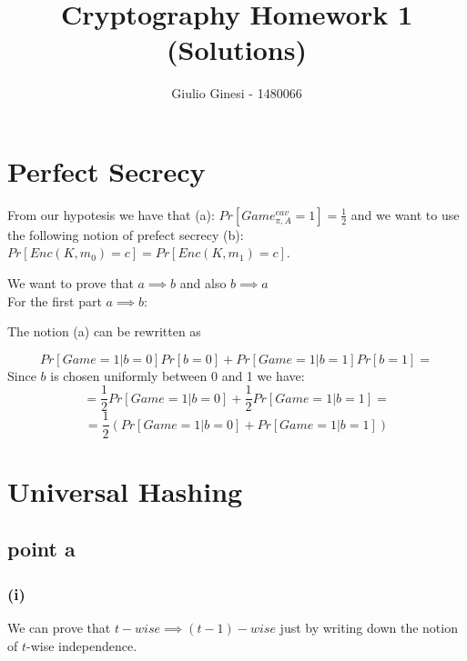 \documentclass[11pt]{article}
\title{\textbf{Cryptography Homework 1}\\ {\normalsize (Solutions)}}
\author{Giulio Ginesi - 1480066}
\date{}
\newcounter{t0d0_counter}
\begin{document}
\maketitle
\tableofcontents

\section{Perfect Secrecy}
\begin{figure}[h!]
   \centering
   \sdinit{}
\end{figure}


From our hypotesis we have that (a): $Pr[Game_{\pi,A}^{eav}=1]=\frac{1}2$ and we want to use the following notion of prefect secrecy (b): $Pr[Enc(K,m_0)=c]=Pr[Enc(K,m_1)=c] $. 

We want to prove that $a \implies b$ and also $ b \implies a $
\\
For the first part $a \implies b$:

The notion (a) can be rewritten as 

$$ Pr[Game=1 | b=0]Pr[b=0]+Pr[Game=1 | b=1]Pr[b=1]=$$
Since $b$ is chosen uniformly between 0 and 1 we have:
$$=\frac{1}{2}Pr[Game=1 | b=0]+\frac{1}{2}Pr[Game=1 | b=1]=$$
$$=\frac{1}{2}(Pr[Game=1 | b=0]+Pr[Game=1 | b=1])$$



\section{Universal Hashing}
 \subsection{point a}
 \subsubsection{(i)}
 We can prove that $t-wise \implies (t-1)-wise$ just by writing down the notion of $t$-wise independence.
\end{document}
